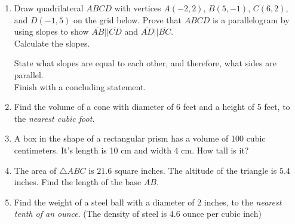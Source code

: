 \documentclass[12pt, twoside]{article}
\begin{document}
\begin{enumerate}
\newpage

  \item Draw quadrilateral $ABCD$ with vertices $A(-2, 2)$, $B(5,-1)$, $C(6,2)$, and $D(-1,5)$ on the grid below. Prove that $ABCD$ is a parallelogram by using slopes to show $\overline{AB} || \overline{CD}$ and $\overline{AD} || \overline{BC}$. \\[0.25cm]
  Calculate the slopes.
  \begin{flushright}
  \end{flushright} \vspace{3cm}
    State what slopes are equal to each other, and therefore, what sides are parallel.\\[4cm]
    Finish with a concluding statement.\\[1cm]

\newpage

  \item Find the volume of a cone with diameter of $6$ feet and a height of 5 feet, to the \emph{nearest cubic foot}. \vspace{2.5cm}

  \item A box in the shape of a rectangular prism has a volume of 100 cubic centimeters. It's length is 10 cm and width 4 cm. How tall is it? \vspace{3.0cm}

  \item The area of $\triangle ABC$ is $21.6$ square inches. The altitude of the triangle is $5.4$ inches. Find the length of the base $AB$.\\[0.5cm]
     \vspace{2.25cm}

  \item Find the weight of a steel ball with a diameter of 2 inches, to the \emph{nearest tenth of an ounce}. (The density of steel is 4.6 ounce per cubic inch)


\end{enumerate}
\end{document}
